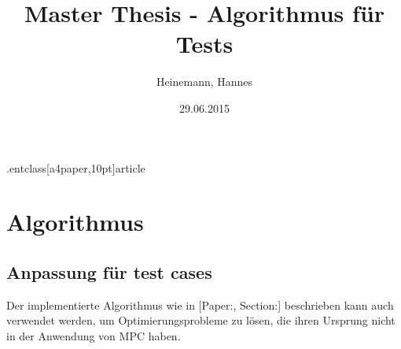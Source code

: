 \docum.entclass[a4paper,10pt]{article}

\usepackage[utf8]{inputenc}

\title{Master Thesis - Algorithmus für Tests}
\author{Heinemann, Hannes}
\date{29.06.2015}



\maketitle
\chapter{Algorithmus}
\label{chap:algorithmus}
\section{Anpassung für test cases}
\label{sec:testcases}
Der implementierte Algorithmus wie in [Paper:, Section:] beschrieben kann auch verwendet werden, um Optimierungsprobleme zu lösen, die ihren Ursprung nicht in der Anwendung von MPC haben.


